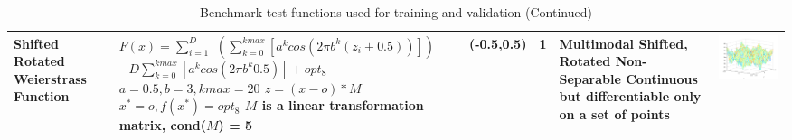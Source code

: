 {\begin{landscape}
\begin{table}[h!]
\begin{tabular}{| p{3cm} | p{6cm} | m{2cm} | m{1.75cm} | p{3cm} | m{6cm} |}
Shifted Rotated \newline Weierstrass \newline Function & 
$F(x)=\sum_{i=1}^{D}$ \newline $(\sum_{k=0}^{kmax}[a^{k}cos(2{\pi}b^{k}(z_{i}+0.5))])$ \newline
$-D\sum_{k=0}^{kmax}[a^kcos(2{\pi}b^k0.5)] + opt_{8}$ \newline
$a=0.5, b=3, kmax=20$ \newline $z = (x - o)*M$ \newline $x^* = o, f(x^*)=opt_8$ \newline
$M$ is a linear transformation matrix, cond($M$) = 5 &
(-0.5,0.5) &
1 &
Multimodal \newline Shifted, Rotated \newline Non-Separable \newline Continuous but \newline differentiable \newline
only on a set \newline of points&
\includegraphics[scale=0.4]{WeierstrassW1.png}\\

\hline
\end{tabular}
\caption{Benchmark test functions used for training and validation (Continued)}
\label{tbl:Table 2}
\end{table}
\end{landscape}
}
\restoregeometry